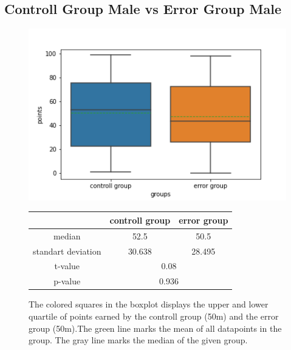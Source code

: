 \documentclass[runningheads]{llncs}
\begin{document}
\subsection{Controll Group Male vs Error Group Male }
\begin{figure}
    \begin{minipage}{0.45\textwidth}        
        \includegraphics[width=\textwidth]{code/generate/all.png}
        \caption{The colored squares in the boxplot displays
        the upper and lower quartile of points earned by the controll group (50m) and
        the error group (50m).The green line marks the mean of all datapoints in the group.
        The gray line marks the median  of the given group.} \label{fig4}
    \end{minipage}
\hfill
\begin{minipage}{0.45\textwidth}
\begin{tabular}[]{| c | c | c |}
        \hline
        & controll group & error group \\
        \hline
        median & 52.5&50.5 \\
        \hline
        standart deviation & 30.638&28.495 \\
        \hline
        t-value & \multicolumn{2}{c|}{0.08} \\
        \hline
        p-value & \multicolumn{2}{c|}{0.936} \\
        \hline            
\end{tabular}
\end{minipage}
\end{figure}
\end{document}
